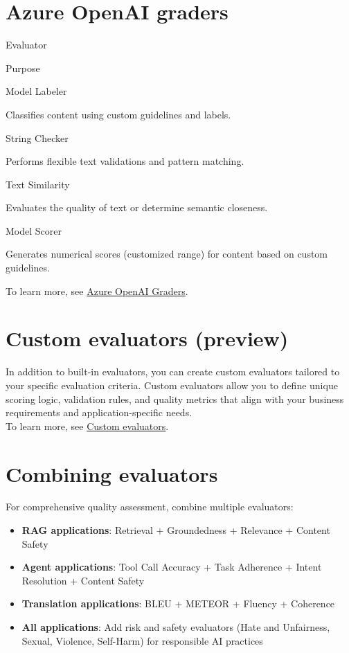 \documentclass[
  letterpaper,
  DIV=11,
  numbers=noendperiod,
  oneside]{scrreprt}
\begin{document}
\begin{tcolorbox}
\section{Azure OpenAI graders}\label{azure-openai-graders}

Evaluator

Purpose

Model Labeler

Classifies content using custom guidelines and labels.

String Checker

Performs flexible text validations and pattern matching.

Text Similarity

Evaluates the quality of text or determine semantic closeness.

Model Scorer

Generates numerical scores (customized range) for content based on
custom guidelines.

To learn more, see
\href{https://learn.microsoft.com/en-us/azure/foundry/concepts/evaluation-evaluators/azure-openai-graders}{Azure
OpenAI Graders}.

\section{Custom evaluators (preview)}\label{custom-evaluators-preview}

In addition to built-in evaluators, you can create custom evaluators
tailored to your specific evaluation criteria. Custom evaluators allow
you to define unique scoring logic, validation rules, and quality
metrics that align with your business requirements and
application-specific needs.\\
To learn more, see
\href{https://learn.microsoft.com/en-us/azure/foundry/concepts/evaluation-evaluators/custom-evaluators}{Custom
evaluators}.

\section{Combining evaluators}\label{combining-evaluators}

For comprehensive quality assessment, combine multiple evaluators:

\begin{itemize}
\item
  \textbf{RAG applications}: Retrieval + Groundedness + Relevance +
  Content Safety
\item
  \textbf{Agent applications}: Tool Call Accuracy + Task Adherence +
  Intent Resolution + Content Safety
\item
  \textbf{Translation applications}: BLEU + METEOR + Fluency + Coherence
\item
  \textbf{All applications}: Add risk and safety evaluators (Hate and
  Unfairness, Sexual, Violence, Self-Harm) for responsible AI practices
\end{itemize}


\end{tcolorbox}
\end{document}
